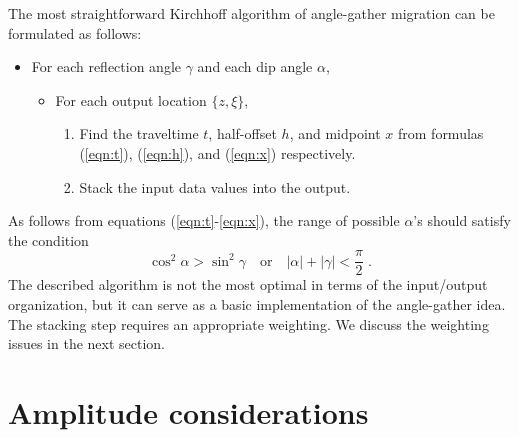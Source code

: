 \par
The most straightforward Kirchhoff algorithm of angle-gather migration
can be formulated as follows:
\begin{itemize}
\item For each reflection angle $\gamma$ and each dip angle $\alpha$,
  \begin{itemize}
  \item For each output location $\{z,\xi\}$,
    \begin{enumerate}
    \item Find the traveltime $t$, half-offset $h$, and midpoint
      $x$ from formulas (\ref{eqn:t}), (\ref{eqn:h}), and
      (\ref{eqn:x}) respectively.
    \item Stack the input data values into the output.
    \end{enumerate}
  \end{itemize}
\end{itemize}
As follows from equations (\ref{eqn:t}-\ref{eqn:x}), the range of
possible $\alpha$'s should satisfy the condition
\begin{equation}
  \label{eqn:range}
  \cos^2{\alpha} > \sin^2{\gamma}\quad\mbox{or}\quad
  |\alpha| + |\gamma| < \frac{\pi}{2}\;.
\end{equation}
The described algorithm is not the most optimal in terms of the
input/output organization, but it can serve as a basic implementation
of the angle-gather idea. The stacking step requires an appropriate
weighting. We discuss the weighting issues in the next section.

\section{Amplitude considerations}

